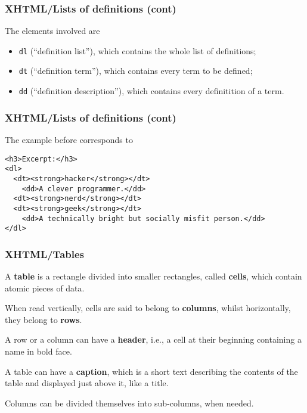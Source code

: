 %
\begin{frame}
\frametitle{XHTML/Lists of definitions (cont)}

The elements involved are
\begin{itemize}

  \item \texttt{dl} (``definition list''), which contains the whole
    list of definitions;

  \item \texttt{dt} (``definition term''), which contains every term
    to be defined;

  \item \texttt{dd} (``definition description''), which contains every
    definitition of a term.

\end{itemize}

\end{frame}

%
\begin{frame}[containsverbatim]
\frametitle{XHTML/Lists of definitions (cont)}

The example before corresponds to
{\small
\begin{verbatim}
<h3>Excerpt:</h3>
<dl>
  <dt><strong>hacker</strong></dt>
    <dd>A clever programmer.</dd>
  <dt><strong>nerd</strong></dt>
  <dt><strong>geek</strong></dt>
    <dd>A technically bright but socially misfit person.</dd>
</dl>
\end{verbatim}
}

\end{frame}

%
\begin{frame}
\frametitle{XHTML/Tables}

A \textbf{table} is a rectangle divided into smaller rectangles,
called \textbf{cells}, which contain atomic pieces of data.

\bigskip

When read vertically, cells are said to belong to \textbf{columns},
whilst horizontally, they belong to \textbf{rows}.

\bigskip

A row or a column can have a \textbf{header}, i.e., a cell at their
beginning containing a name in bold face.

\bigskip

A table can have a \textbf{caption}, which is a short text describing
the contents of the table and displayed just above it, like a title.

\bigskip

Columns can be divided themselves into sub-columns, when needed.

\end{frame}

